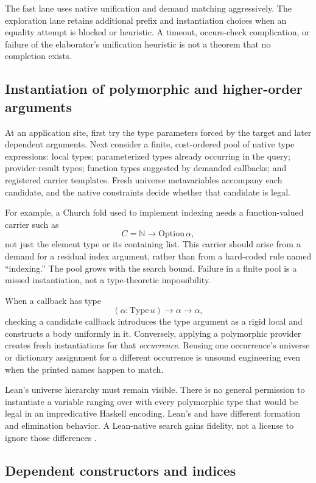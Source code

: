 \documentclass[11pt,a4paper]{article}
\newcommand{\code}[1]{\texttt{\detokenize{#1}}}
\newcommand{\N}{\mathbb N}
\theoremstyle{remark}
\begin{document}
The fast lane uses native unification and demand matching aggressively. The exploration lane retains additional prefix and instantiation choices when an equality attempt is blocked or heuristic. A timeout, occurs-check complication, or failure of the elaborator's unification heuristic is not a theorem that no completion exists.

\subsection{Instantiation of polymorphic and higher-order arguments}

At an application site, first try the type parameters forced by the target and later dependent arguments. Next consider a finite, cost-ordered pool of native type expressions: local types; parameterized types already occurring in the query; provider-result types; function types suggested by demanded callbacks; and registered carrier templates. Fresh universe metavariables accompany each candidate, and the native constraints decide whether that candidate is legal.

For example, a Church fold used to implement indexing needs a function-valued carrier such as
\[
 C=\N\to\mathrm{Option}\,\alpha,
\]
not just the element type or its containing list. This carrier should arise from a demand for a residual index argument, rather than from a hard-coded rule named ``indexing.'' The pool grows with the search bound. Failure in a finite pool is a missed instantiation, not a type-theoretic impossibility.

When a callback has type
\[
 (\alpha:\mathrm{Type}\,u)\to\alpha\to\alpha,
\]
checking a candidate callback introduces the type argument as a rigid local and constructs a body uniformly in it. Conversely, applying a polymorphic provider creates fresh instantiations for that \emph{occurrence}. Reusing one occurrence's universe or dictionary assignment for a different occurrence is unsound engineering even when the printed names happen to match.

Lean's universe hierarchy must remain visible. There is no general permission to instantiate a variable ranging over \code{Type u} with every polymorphic type that would be legal in an impredicative Haskell encoding. Lean's \code{Prop} and \code{Type} have different formation and elimination behavior. A Lean-native search gains fidelity, not a license to ignore those differences \cite{lean-types}.

\subsection{Dependent constructors and indices}
\end{document}
